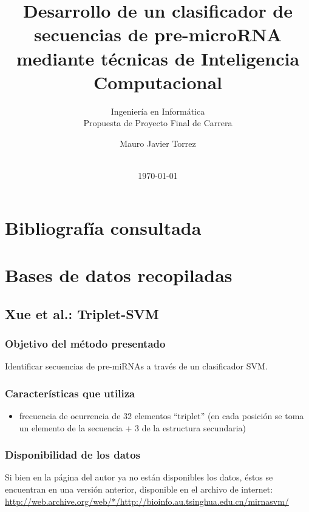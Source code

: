 \documentclass[12pt,bibliography=openstyle,DIV=12,parskip=half-]{scrartcl}
\begin{document}
%
\begin{titlepage}
%
\titlehead{\center Universidad Nacional del Litoral\\
  Facultad de Ingeniería y Ciencias Hídricas}
%
\subtitle{Ingeniería en Informática\\
  Propuesta de Proyecto Final de Carrera}
%
\title{Desarrollo de un clasificador de secuencias de pre-microRNA
  mediante técnicas de Inteligencia Computacional}
\subject{Informe entregable 1}
\author{Mauro Javier Torrez}
%
\publishers{\-\\[4em]{Director\\Dr. Diego H. Milone}\\[2em]
  {Asesora temática\\Dra. Georgina S. Stegmayer}}
%
\date{\-\\[2em]\today}
%
\renewcommand*{\titlepagestyle}{empty}
\maketitle
\end{titlepage}
\setcounter{page}{1}
%
%
%
%
\section{Bibliografía consultada}
\section{Bases de datos recopiladas}
\subsection{Xue et al.: Triplet-SVM}
\subsubsection{Objetivo del método presentado}
Identificar secuencias de pre-miRNAs a través de un clasificador SVM.
\subsubsection{Características que utiliza}
\begin{itemize}
\item frecuencia de ocurrencia de 32 elementos ``triplet'' (en cada
  posición se toma un elemento de la secuencia + 3 de la estructura
  secundaria)
\end{itemize}
\subsubsection{Disponibilidad de los datos}
Si bien en la página del autor ya no están disponibles los datos,
éstos se encuentran en una versión anterior, disponible en el archivo
de internet: \url{http://web.archive.org/web/*/http://bioinfo.au.tsinghua.edu.cn/mirnasvm/}
\end{document}
